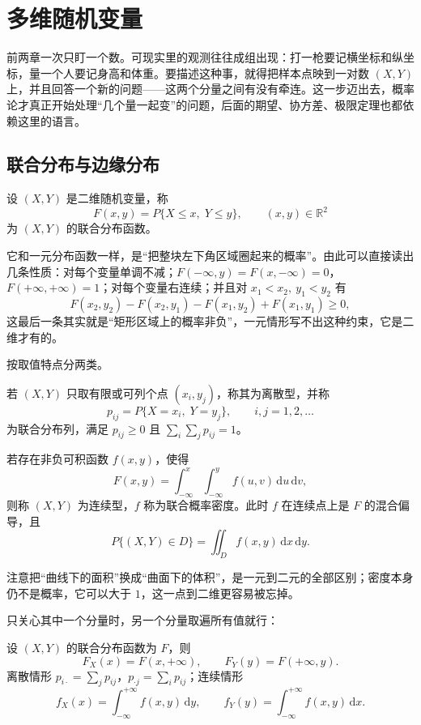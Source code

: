 \section{多维随机变量}

前两章一次只盯一个数。可现实里的观测往往成组出现：打一枪要记横坐标和纵坐标，量一个人要记身高和体重。要描述这种事，就得把样本点映到一对数 $(X,Y)$ 上，并且回答一个新的问题——这两个分量之间有没有牵连。这一步迈出去，概率论才真正开始处理“几个量一起变”的问题，后面的期望、协方差、极限定理也都依赖这里的语言。

\subsection{联合分布与边缘分布}

\begin{definition}[联合分布函数]
设 $(X,Y)$ 是二维随机变量，称
\[
F(x,y)=P\{X\le x,\; Y\le y\},\qquad (x,y)\in\mathbb{R}^2
\]
为 $(X,Y)$ 的联合分布函数。
\end{definition}

它和一元分布函数一样，是“把整块左下角区域圈起来的概率”。由此可以直接读出几条性质：对每个变量单调不减；$F(-\infty,y)=F(x,-\infty)=0$，$F(+\infty,+\infty)=1$；对每个变量右连续；并且对 $x_1<x_2,\ y_1<y_2$ 有
\[
F(x_2,y_2)-F(x_2,y_1)-F(x_1,y_2)+F(x_1,y_1)\ge 0 ,
\]
这最后一条其实就是“矩形区域上的概率非负”，一元情形写不出这种约束，它是二维才有的。

按取值特点分两类。

\begin{definition}[二维离散型]
若 $(X,Y)$ 只取有限或可列个点 $(x_i,y_j)$，称其为离散型，并称
\[
p_{ij}=P\{X=x_i,\;Y=y_j\},\qquad i,j=1,2,\dots
\]
为联合分布列，满足 $p_{ij}\ge 0$ 且 $\sum_i\sum_j p_{ij}=1$。
\end{definition}

\begin{definition}[二维连续型]
若存在非负可积函数 $f(x,y)$，使得
\[
F(x,y)=\int_{-\infty}^{x}\!\!\int_{-\infty}^{y} f(u,v)\,\mathrm{d}u\,\mathrm{d}v ,
\]
则称 $(X,Y)$ 为连续型，$f$ 称为联合概率密度。此时 $f$ 在连续点上是 $F$ 的混合偏导，且
\[
P\{(X,Y)\in D\}=\iint_D f(x,y)\,\mathrm{d}x\,\mathrm{d}y .
\]
\end{definition}

注意把“曲线下的面积”换成“曲面下的体积”，是一元到二元的全部区别；密度本身仍不是概率，它可以大于 $1$，这一点到二维更容易被忘掉。

只关心其中一个分量时，另一个分量取遍所有值就行：

\begin{proposition}[边缘分布]
设 $(X,Y)$ 的联合分布函数为 $F$，则
\[
F_X(x)=F(x,+\infty),\qquad F_Y(y)=F(+\infty,y).
\]
离散情形 $p_{i\cdot}=\sum_j p_{ij}$，$p_{\cdot j}=\sum_i p_{ij}$；连续情形
\[
f_X(x)=\int_{-\infty}^{+\infty} f(x,y)\,\mathrm{d}y,\qquad
f_Y(y)=\int_{-\infty}^{+\infty} f(x,y)\,\mathrm{d}x .
\]
\end{proposition}

